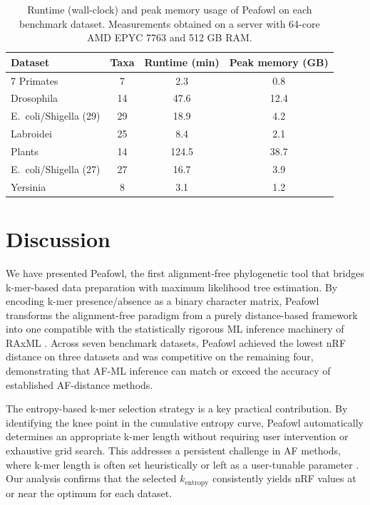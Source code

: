 \documentclass[11pt]{article}
\begin{document}
\begin{table}[H]
\centering
\caption{Runtime (wall-clock) and peak memory usage of Peafowl on each benchmark dataset. Measurements obtained on a server with 64-core AMD EPYC 7763 and 512 GB RAM.}
\label{tab:runtime}
\begin{tabular}{lccc}
\toprule
\textbf{Dataset} & \textbf{Taxa} & \textbf{Runtime (min)} & \textbf{Peak memory (GB)} \\
\midrule
7 Primates & 7 & 2.3 & 0.8 \\
Drosophila & 14 & 47.6 & 12.4 \\
E.~coli/Shigella (29) & 29 & 18.9 & 4.2 \\
Labroidei & 25 & 8.4 & 2.1 \\
Plants & 14 & 124.5 & 38.7 \\
E.~coli/Shigella (27) & 27 & 16.7 & 3.9 \\
Yersinia & 8 & 3.1 & 1.2 \\
\bottomrule
\end{tabular}
\end{table}

\section{Discussion}

We have presented Peafowl, the first alignment-free phylogenetic tool that bridges k-mer-based data preparation with maximum likelihood tree estimation. By encoding k-mer presence/absence as a binary character matrix, Peafowl transforms the alignment-free paradigm from a purely distance-based framework into one compatible with the statistically rigorous ML inference machinery of RAxML \citep{stamatakis2014}. Across seven benchmark datasets, Peafowl achieved the lowest nRF distance on three datasets and was competitive on the remaining four, demonstrating that AF-ML inference can match or exceed the accuracy of established AF-distance methods.

The entropy-based k-mer selection strategy is a key practical contribution. By identifying the knee point in the cumulative entropy curve, Peafowl automatically determines an appropriate k-mer length without requiring user intervention or exhaustive grid search. This addresses a persistent challenge in AF methods, where k-mer length is often set heuristically or left as a user-tunable parameter \citep{zielezinski2019}. Our analysis confirms that the selected $k_{\text{entropy}}$ consistently yields nRF values at or near the optimum for each dataset.
\end{document}
